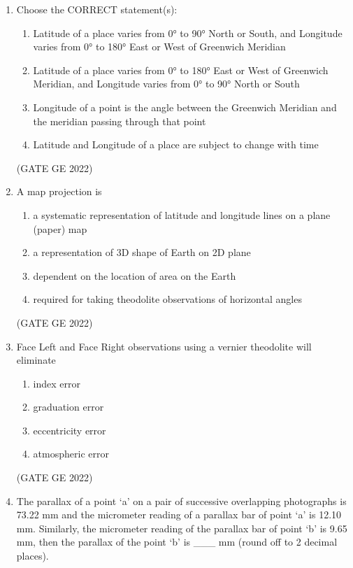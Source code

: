 \documentclass[journal,12pt,onecolumn]{IEEEtran}
\theoremstyle{remark}
\begin{document}
\begin{enumerate}
\item Choose the CORRECT statement(s):
\begin{enumerate}
    \item Latitude of a place varies from 0° to 90° North or South, and Longitude varies from 0° to 180° East or West of Greenwich Meridian
    \item Latitude of a place varies from 0° to 180° East or West of Greenwich Meridian, and Longitude varies from 0° to 90° North or South
    \item Longitude of a point is the angle between the Greenwich Meridian and the meridian passing through that point
    \item Latitude and Longitude of a place are subject to change with time
\end{enumerate}

\hfill (GATE GE 2022)

\item A map projection is
\begin{enumerate}
    \item a systematic representation of latitude and longitude lines on a plane (paper) map
    \item a representation of 3D shape of Earth on 2D plane
    \item dependent on the location of area on the Earth
    \item required for taking theodolite observations of horizontal angles
\end{enumerate}

\hfill (GATE GE 2022)

\item Face Left and Face Right observations using a vernier theodolite will eliminate
\begin{enumerate}
    \item index error
    \item graduation error
    \item eccentricity error
    \item atmospheric error
\end{enumerate}

\hfill (GATE GE 2022)

\item The parallax of a point ‘a’ on a pair of successive overlapping photographs is 73.22 mm and the micrometer reading of a parallax bar of point ‘a’ is 12.10 mm. Similarly, the micrometer reading of the parallax bar of point ‘b’ is 9.65 mm, then the parallax of the point ‘b’ is \_\_\_ mm (round off to 2 decimal places).


\end{enumerate}
\end{document}
